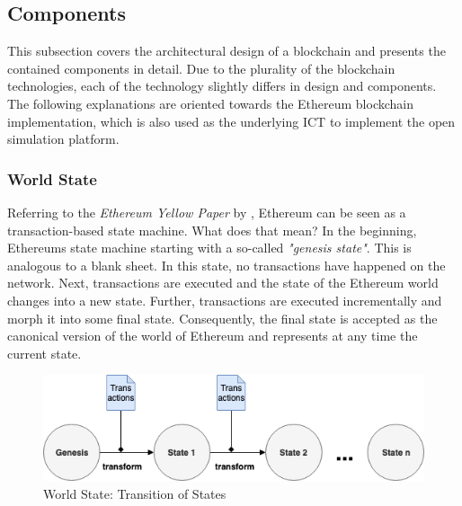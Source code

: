 \subsection{Components}
This subsection covers the architectural design of a blockchain and presents the 
contained components in detail. Due to the plurality of the blockchain technologies, 
each of the technology slightly differs in design and components. 
The following explanations are oriented towards the Ethereum blockchain 
implementation, which is also used as the underlying ICT to implement 
the open simulation platform.

\subsubsection{World State}
\label{sec:world_state}
Referring to the \textit{Ethereum Yellow Paper} by , Ethereum 
can be seen as a transaction-based state machine. What does that mean? 
In the beginning, Ethereums state machine starting with a so-called 
\textit{"genesis state"}. This is analogous to a blank sheet. 
In this state, no transactions have happened on the network. 
Next, transactions are executed and the state of the Ethereum world 
changes into a new state. Further, transactions are executed incrementally 
and morph it into some final state. Consequently, the final state 
is accepted as the canonical version of the world of Ethereum and 
represents at any time the current state.

\begin{figure}[htbp]
	\centering
	\includegraphics[width=.75\linewidth]{./figures/state_transition.png}
	\caption{World State: Transition of States}
	\label{figure:state_transition}
\end{figure}

